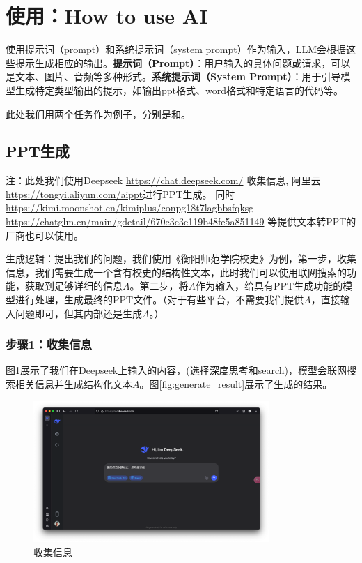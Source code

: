 \documentclass{article}
\begin{document}
\newpage
\section{使用：How to use AI}

 使用提示词（prompt）和系统提示词（system prompt）作为输入，LLM会根据这些提示生成相应的输出。\textbf{提示词（Prompt）}：用户输入的具体问题或请求，可以是文本、图片、音频等多种形式。\textbf{系统提示词（System Prompt）}：用于引导模型生成特定类型输出的提示，如输出ppt格式、word格式和特定语言的代码等。

此处我们用两个任务作为例子，分别是和。

\subsection{PPT生成}

\noindent 注：此处我们使用Deepseek \url{https://chat.deepseek.com/} 收集信息, 阿里云 \url{https://tongyi.aliyun.com/aippt}进行PPT生成。  同时 \url{https://kimi.moonshot.cn/kimiplus/conpg18t7lagbbsfqksg}  \url{https://chatglm.cn/main/gdetail/670e3c3e119b48fe5a851149} 等提供文本转PPT的厂商也可以使用。

生成逻辑：提出我们的问题，我们使用《衡阳师范学院校史》为例，第一步，收集信息，我们需要生成一个含有校史的结构性文本，此时我们可以使用联网搜索的功能，获取到足够详细的信息$A$。第二步，将$A$作为输入，给具有PPT生成功能的模型进行处理，生成最终的PPT文件。（对于有些平台，不需要我们提供$A$，直接输入问题即可，但其内部还是生成$A$。）

\subsubsection{步骤1：收集信息}\label{sec:collect_info}

图\ref{fig:collect_info}展示了我们在Deepseek上输入的内容，(选择深度思考和search)，模型会联网搜索相关信息并生成结构化文本$A$。图\ref{fig:generate_result}展示了生成的结果。
\begin{figure}[htbp]
  \centering
  \includegraphics[width=0.8\textwidth]{./fig/search.png}
  \caption{收集信息}
  \label{fig:collect_info}
\end{figure}
\end{document}
